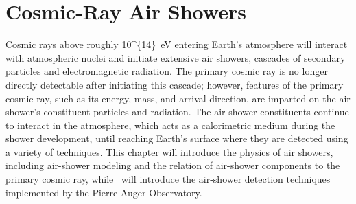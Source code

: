 %
%
\chapter{Cosmic-Ray Air Showers}\label{chap:airshowers}
Cosmic rays above roughly \qty[parse-numbers=false]{10^{14}}{\electronvolt} entering Earth's atmosphere will interact with atmospheric nuclei and initiate extensive air showers, cascades of secondary particles and electromagnetic radiation.
The primary cosmic ray is no longer directly detectable after initiating this cascade; however, features of the primary cosmic ray, such as its energy, mass, and arrival direction, are imparted on the air shower's constituent particles and radiation.
The air-shower constituents continue to interact in the atmosphere, which acts as a calorimetric medium during the shower development, until reaching Earth's surface where they are detected using a variety of techniques.
This chapter will introduce the physics of air showers, including air-shower modeling and the relation of air-shower components to the primary cosmic ray, while~ will introduce the air-shower detection techniques implemented by the Pierre Auger Observatory.










